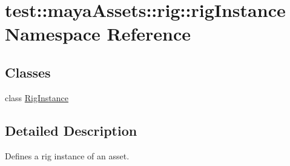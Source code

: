 \hypertarget{namespacetest_1_1mayaAssets_1_1rig_1_1rigInstance}{\section{test\-:\-:maya\-Assets\-:\-:rig\-:\-:rig\-Instance \-Namespace \-Reference}
\label{de/df3/namespacetest_1_1mayaAssets_1_1rig_1_1rigInstance}
}
\subsection*{\-Classes}
\begin{DoxyCompactItemize}
\item 
class \hyperlink{classtest_1_1mayaAssets_1_1rig_1_1rigInstance_1_1RigInstance}{\-Rig\-Instance}
\end{DoxyCompactItemize}


\subsection{\-Detailed \-Description}
\begin{DoxyVerb}
Defines a rig instance of an asset.
\end{DoxyVerb}
 